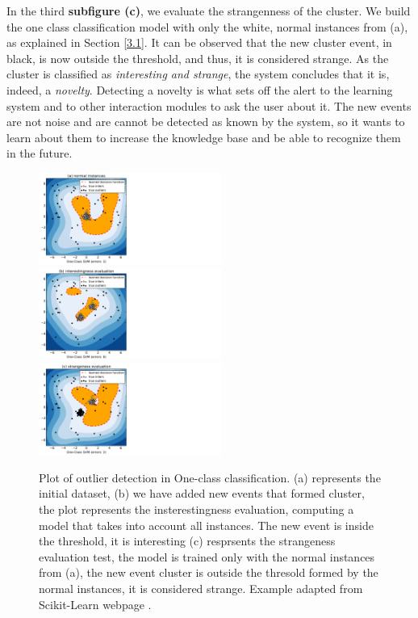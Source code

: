 In the third \textbf{subfigure (c)}, we evaluate the strangenness of the cluster. We build the one class classification model with only the white, normal instances from (a), as explained in Section \ref{3.1}. It can be observed that the new cluster event, in black, is now outside the threshold, and thus, it is considered strange. As the cluster is classified as  \emph{interesting and strange}, the system concludes that it is, indeed, a \emph{novelty}. Detecting a novelty is what sets off the alert to the learning system and to other interaction modules to ask the user about it. The new events are not noise and are cannot be detected as known by the system, so it wants to learn about them to increase the knowledge base and be able to recognize them in the future. 

\begin{figure}[!htb]
\includegraphics[width=6cm]{Figures/one_class/a}
\centering
\\[\baselineskip]
  \includegraphics[width=6cm]{Figures/one_class/b}
  \centering
\endminipage\hfill
{}%
  \includegraphics[width=6cm]{Figures/one_class/c}
    \centering
\endminipage\hfill
 
\caption[Plot of outlier detection in One-class classification]{Plot of outlier detection in One-class classification. (a) represents the initial dataset, (b) we have added new events that formed cluster, the plot represents the insterestingness evaluation, computing a model that takes into account all instances. The new event is inside the threshold, it is interesting (c) resprsents the strangeness evaluation test, the model is trained only with the normal instances from (a), the new event cluster is outside the thresold formed by the normal instances, it is considered strange. Example adapted from Scikit-Learn webpage \cite{scikit-learn}. \label{fig:plot_out}}
\end{figure}

